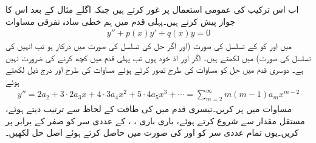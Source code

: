 اب اس ترکیب کی عمومی استعمال پر غور کرتے ہیں جبکہ اگلے مثال کے بعد اس کا جواز پیش کرتے ہیں۔پہلی قدم میں ہم خطی سادہ تفرقی مساوات
\begin{align}\label{مساوات_بیسل_طاقتی_عمومی_مساوات_الف}
y''+p(x)y'+q(x)y=0
\end{align}
میں  اور  کو  کے تسلسل کی صورت  (اور اگر حل  کی تسلسل کی صورت میں درکار ہو تب انہیں  کی تسلسل کی صورت) میں لکھتے ہیں۔ اگر  اور  اذ خود    ہوں تب پہلی قدم میں کچھ کرنے کی ضرورت نہیں ہے۔ دوسری قدم میں حل کو مساوات  کی طرح تصور کرتے ہوئے  مساوات  کی طرح  اور درج ذیل  لکھتے ہوئے
\begin{align}\label{مساوات_بیسل_طاقتی_تسلسل_حل_پ}
y''=2a_2+3\cdot 2 a_3x+4\cdot 3 a_4x^2+5\cdot 4 a_5 x^3+\cdots=\sum_{m=2}^{\infty} m(m-1)a_mx^{m-2}
\end{align}
مساوات  میں پر کریں۔تیسری قدم میں  کی طاقت کے لحاظ سے ترتیب دیتے ہوئے، مستقل مقدار سے شروع کرتے ہوئے، باری باری ، ،  کے عددی سر کو صفر کے برابر پر کریں۔یوں تمام عددی سر کو  اور  کی صورت میں حاصل کرتے ہوئے اصل حل لکھیں۔

